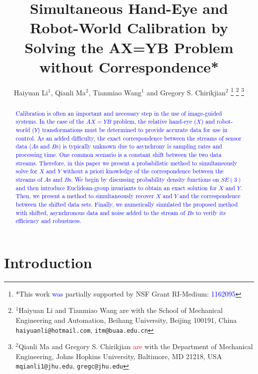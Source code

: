 \documentclass[letterpaper, 10 pt, conference]{ieeeconf}  %
\title{\LARGE \bf
Simultaneous Hand-Eye and Robot-World Calibration by Solving the AX=YB Problem without Correspondence*
}
\author{Haiyuan Li$^{1}$, Qianli Ma$^{2}$, Tianmiao Wang$^{1}$ and Gregory S. Chirikjian$^{2}$%
\thanks{*This work \textcolor{blue}{was} %
partially
supported by NSF Grant RI-Medium: \textcolor{blue}{1162095}}%
\thanks{$^{1}$Haiyuan Li and Tianmiao Wang are with the School of Mechanical Engineering and Automation, Beihang University, Beijing 100191, China
        {\tt\small haiyuanli@hotmail.com}, {\tt\small itm@buaa.edu.cn}}%
\thanks{$^{2}$Qianli Ma and Gregory S. Chirikjian \textcolor{red}{are} with the Department of Mechanical Engineering, Johns Hopkins University,
        Baltimore, MD 21218, USA
        {\tt\small mqianli1@jhu.edu}, {\tt\small gregc@jhu.edu}}%
}
\begin{document}
\maketitle
\thispagestyle{empty}
\pagestyle{empty}


\begin{abstract}

\textcolor{blue}{Calibration is often an important and necessary step in the use of image-guided systems. In the case of the $AX=YB$ problem, the relative hand-eye ($X$) and robot-world ($Y$) transformations must be determined to provide accurate data for use in control. As an added difficulty, the exact correspondence between the streams of sensor data ($A$s and $B$s) is typically unknown due to asynchrony is sampling rates and processing time. One common scenario is a constant shift between the two data streams. Therefore, in this paper we present a probabilistic method to simultaneously solve for $X$ and $Y$ without a priori knowledge of the correspondence between the streams of $A$s and $B$s. We begin by discussing probability density functions on $SE(3)$ and then introduce Euclidean-group invariants to obtain an exact solution for $X$ and $Y$. Then, we present a method to simultaneously recover $X$ and $Y$ and the correspondence between the shifted data sets. Finally, we numerically simulated the proposed method with shifted, asynchronous data and noise added to the stream of $B$s to verify its efficiency and robustness. }

\end{abstract}



\section{Introduction}
\end{document}
